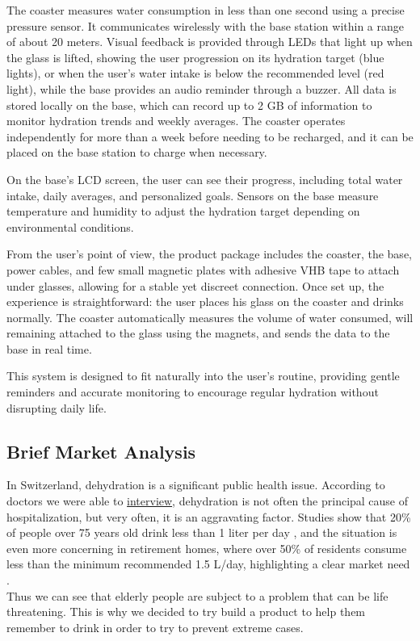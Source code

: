 \documentclass{article}
\begin{document}
The coaster measures water consumption in less than one second using a precise pressure sensor. It communicates wirelessly with the base station within a range of about 20 meters. Visual feedback is provided through LEDs that light up when the glass is lifted, showing the user progression on its hydration target (blue lights), or when the user’s water intake is below the recommended level (red light), while the base provides an audio reminder through a buzzer. All data is stored locally on the base, which can record up to 2 GB of information to monitor hydration trends and weekly averages. The coaster operates independently for more than a week before needing to be recharged, and it can be placed on the base station to charge when necessary.\vspace{0.2cm} 

On the base’s LCD screen, the user can see their progress, including total water intake, daily averages, and personalized goals. Sensors on the base measure temperature and humidity to adjust the hydration target depending on environmental conditions.\vspace{0.2cm}  

From the user’s point of view, the product package includes the coaster, the base, power cables, and few small magnetic plates with adhesive VHB tape to attach under glasses, allowing for a stable yet discreet connection. Once set up, the experience is straightforward: the user places his glass on the coaster and drinks normally. The coaster automatically measures the volume of water consumed, will remaining attached to the glass using the magnets, and sends the data to the base in real time.\vspace{0.2cm} 

This system is designed to fit naturally into the user’s routine, providing gentle reminders and accurate monitoring to encourage regular hydration without disrupting daily life.
\newpage
\subsection{Brief Market Analysis}
In Switzerland, dehydration is a significant public health issue. According to doctors we were able to \hyperref[appendix:interview]{interview}, dehydration is not often the principal cause of hospitalization, but very often, it is an aggravating factor. Studies show that 20\% of people over 75 years old drink less than 1 liter per day \cite{Senso5}, and the situation is even more concerning in retirement homes, where over 50\% of residents consume less than the minimum recommended 1.5 L/day, highlighting a clear market need \cite{EMS}.\\
Thus we can see that elderly people are subject to a problem that can be life threatening. This is why we decided to try build a product to help them remember to drink in order to try to prevent extreme cases.
\end{document}
